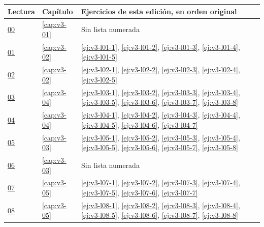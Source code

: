 {\small
\begin{longtable}{@{}p{}p{}p{}@{}}
\toprule Lectura & Capítulo & Ejercicios de esta edición, en orden original\\\midrule\endhead
\href{https://drive.google.com/file/d/1XpHqhZj-Qgomje3JNqzS0VZ5DE024Uk2/view?usp=drivesdk}{00} & \ref{cap:v3-01} & Sin lista numerada \\
\href{https://drive.google.com/file/d/1rj1sJMWEx5I3iu9m9wPwf-h5HMv7TEVq/view?usp=drivesdk}{01} & \ref{cap:v3-02} & \ref{ej:v3-l01-1}, \ref{ej:v3-l01-2}, \ref{ej:v3-l01-3}, \ref{ej:v3-l01-4}, \ref{ej:v3-l01-5} \\
\href{https://drive.google.com/file/d/1g_Q7eV7ROZ5ZIClzH4GaLryOoTke4mr3/view?usp=drivesdk}{02} & \ref{cap:v3-02} & \ref{ej:v3-l02-1}, \ref{ej:v3-l02-2}, \ref{ej:v3-l02-3}, \ref{ej:v3-l02-4}, \ref{ej:v3-l02-5} \\
\href{https://drive.google.com/file/d/1uQeH0ZOsBR9E3USQTl1UwGITpPOTEHV5/view?usp=drivesdk}{03} & \ref{cap:v3-04} & \ref{ej:v3-l03-1}, \ref{ej:v3-l03-2}, \ref{ej:v3-l03-3}, \ref{ej:v3-l03-4}, \ref{ej:v3-l03-5}, \ref{ej:v3-l03-6}, \ref{ej:v3-l03-7}, \ref{ej:v3-l03-8} \\
\href{https://drive.google.com/file/d/1OVUpPbX7l6LSuWYFCbRhxjqIhJZHTbCi/view?usp=drivesdk}{04} & \ref{cap:v3-04} & \ref{ej:v3-l04-1}, \ref{ej:v3-l04-2}, \ref{ej:v3-l04-3}, \ref{ej:v3-l04-4}, \ref{ej:v3-l04-5}, \ref{ej:v3-l04-6}, \ref{ej:v3-l04-7} \\
\href{https://drive.google.com/file/d/1XHrmpIOr199FAWI6VLJxW8MBQ-vACsvN/view?usp=drivesdk}{05} & \ref{cap:v3-03} & \ref{ej:v3-l05-1}, \ref{ej:v3-l05-2}, \ref{ej:v3-l05-3}, \ref{ej:v3-l05-4}, \ref{ej:v3-l05-5}, \ref{ej:v3-l05-6}, \ref{ej:v3-l05-7}, \ref{ej:v3-l05-8} \\
\href{https://drive.google.com/file/d/1fRH0mb7jA2rwfuvPlZwLApRiaPGPFWH4/view?usp=drivesdk}{06} & \ref{cap:v3-03} & Sin lista numerada \\
\href{https://drive.google.com/file/d/1pNsZMI1JJt2kIOKcCh-HMNkWjGKJwSyf/view?usp=drivesdk}{07} & \ref{cap:v3-05} & \ref{ej:v3-l07-1}, \ref{ej:v3-l07-2}, \ref{ej:v3-l07-3}, \ref{ej:v3-l07-4}, \ref{ej:v3-l07-5}, \ref{ej:v3-l07-6}, \ref{ej:v3-l07-7} \\
\href{https://drive.google.com/file/d/1D1JUAxTIYs-Lfec06z50ukY4_hMDWRK1/view?usp=drivesdk}{08} & \ref{cap:v3-05} & \ref{ej:v3-l08-1}, \ref{ej:v3-l08-2}, \ref{ej:v3-l08-3}, \ref{ej:v3-l08-4}, \ref{ej:v3-l08-5}, \ref{ej:v3-l08-6}, \ref{ej:v3-l08-7}, \ref{ej:v3-l08-8} \\

\end{longtable}}
